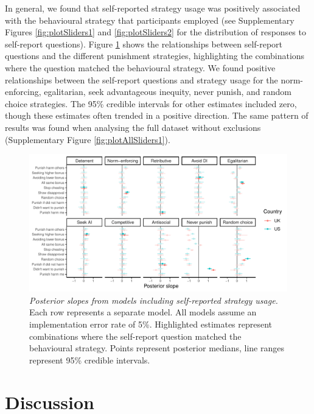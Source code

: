 \documentclass[
  man,floatsintext]{apa6}
\begin{document}
In general, we found that self-reported strategy usage was positively associated
with the behavioural strategy that participants employed (see Supplementary
Figures \ref{fig:plotSliders1} and \ref{fig:plotSliders2} for the distribution
of responses to self-report questions). Figure \ref{fig:plotAllSliders2} shows
the relationships between self-report questions and the different punishment
strategies, highlighting the combinations where the question matched the
behavioural strategy. We found positive relationships between the self-report
questions and strategy usage for the norm-enforcing, egalitarian, seek
advantageous inequity, never punish, and random choice strategies. The 95\%
credible intervals for other estimates included zero, though these estimates
often trended in a positive direction. The same pattern of results was found
when analysing the full dataset without exclusions (Supplementary Figure
\ref{fig:plotAllSliders1}).








\begin{figure}
\centering
\includegraphics{manuscript_files/figure-latex/plotAllSliders2-1.pdf}
\caption{\label{fig:plotAllSliders2}\emph{Posterior slopes from models including
self-reported strategy usage.} Each row represents a separate model. All models
assume an implementation error rate of 5\%. Highlighted estimates represent
combinations where the self-report question matched the behavioural strategy.
Points represent posterior medians, line ranges represent 95\% credible
intervals.}
\end{figure}

\hypertarget{discussion}{%
\section{Discussion}\label{discussion}}
\end{document}
